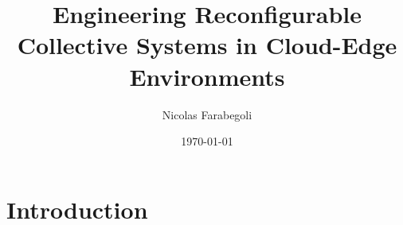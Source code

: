 \documentclass[12pt,a4paper]{article}
\title{Engineering Reconfigurable Collective Systems in Cloud-Edge Environments}
\author{Nicolas Farabegoli}
\date{\today}
\begin{document}
\maketitle

\section{Introduction}\label{sec:introduction}

%
%
%
\end{document}
